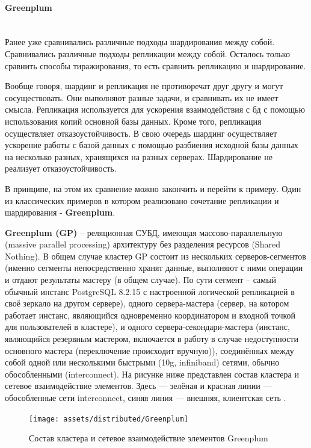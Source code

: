 \paragraph{Greenplum} ~\\
Ранее уже сравнивались различные подходы шардирования между собой. Сравнивались различные подходы репликации между
собой. Осталось только сравнить способы тиражирования, то есть сравнить репликацию и шардирование.

Вообще говоря, шардинг и репликация не противоречат друг другу и могут сосуществовать. Они выполняют разные задачи, и
сравнивать их не имеет смысла. Репликация используется для ускорения взаимодействия с бд с помощью использования копий
основной базы данных. Кроме того, репликация осуществляет отказоустойчивость. В свою очередь шардинг осуществляет
ускорение работы с базой данных с помощью разбиения исходной базы данных на несколько разных, хранящихся на разных
серверах.  Шардирование не реализует отказоустойчивость.

В принципе, на этом их сравнение можно закончить и перейти к примеру. Один из классических примеров в котором
реализовано сочетание репликации и шардирования - \textbf{Greenplum}.

\textbf{Greenplum (GP)} – реляционная СУБД, имеющая массово-параллельную (massive parallel processing) архитектуру без
разделения ресурсов (Shared Nothing). В общем случае кластер GP состоит из нескольких серверов-сегментов (именно
сегменты непосредственно хранят данные, выполняют с ними операции и отдают результаты мастеру (в общем случае). По сути
сегмент – самый обычный инстанс PostgreSQL 8.2.15 с настроенной логической репликацией в своё зеркало на другом
сервере), одного сервера-мастера (сервер, на котором работает инстанс, являющийся одновременно координатором и входной
точкой для пользователей в кластере), и одного сервера-секондари-мастера (инстанс, являющийся резервным мастером,
включается в работу в случае недоступности основного мастера (переключение происходит вручную)), соединённых между
собой одной или несколькими быстрыми (10g, infiniband) сетями, обычно обособленными (interconnect). На рисунке ниже
представлен состав кластера и сетевое взаимодействие элементов. Здесь — зелёная и красная линии — обособленные сети
interconnect, синяя линия — внешняя, клиентская сеть \autocite{Greenplum}.

\begin{figure}[H]
    \centering
    \texttt{[image: assets/distributed/Greenplum]}
    \caption{Состав кластера и сетевое взаимодействие элементов Greenplum}
    \label{fig:Greenplum}
\end{figure}

